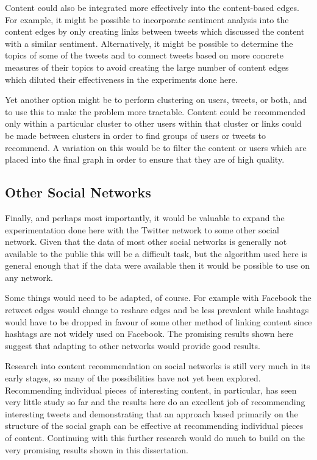 Content could also be integrated more effectively into the content-based edges. For example, it might be possible to incorporate sentiment analysis into the content edges by only creating links between tweets which discussed the content with a similar sentiment. Alternatively, it might be possible to determine the topics of some of the tweets and to connect tweets based on more concrete measures of their topics to avoid creating the large number of content edges which diluted their effectiveness in the experiments done here.

Yet another option might be to perform clustering on users, tweets, or both, and to use this to make the problem more tractable. Content could be recommended only within a particular cluster to other users within that cluster or links could be made between clusters in order to find groups of users or tweets to recommend. A variation on this would be to filter the content or users which are placed into the final graph in order to ensure that they are of high quality.

\subsection{Other Social Networks}

Finally, and perhaps most importantly, it would be valuable to expand the experimentation done here with the Twitter network to some other social network. Given that the data of most other social networks is generally not available to the public this will be a difficult task, but the algorithm used here is general enough that if the data were available then it would be possible to use on any network.

Some things would need to be adapted, of course. For example with Facebook the retweet edges would change to reshare edges and be less prevalent while hashtags would have to be dropped in favour of some other method of linking content since hashtags are not widely used on Facebook. The promising results shown here suggest that adapting to other networks would provide good results.

Research into content recommendation on social networks is still very much in its early stages, so many of the possibilities have not yet been explored. Recommending individual pieces of interesting content, in particular, has seen very little study so far and the results here do an excellent job of recommending interesting tweets and demonstrating that an approach based primarily on the structure of the social graph can be effective at recommending individual pieces of content. Continuing with this further research would do much to build on the very promising results shown in this dissertation. 

